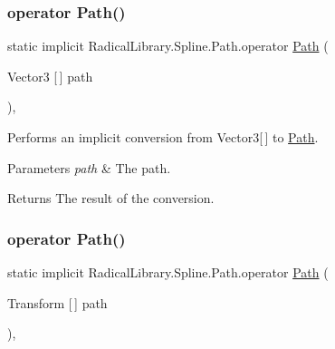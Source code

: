 \subsubsection{\texorpdfstring{operator Path()}{operator Path()}\hspace{0.1cm}{\footnotesize\ttfamily [1/3]}}
{\footnotesize\ttfamily static implicit Radical\+Library.\+Spline.\+Path.\+operator \hyperlink{class_radical_library_1_1_spline_1_1_path}{Path} (\begin{DoxyParamCaption}\item[{Vector3 \mbox{[}$\,$\mbox{]}}]{path }\end{DoxyParamCaption})\hspace{0.3cm}{\ttfamily [inline]}, {\ttfamily [static]}}



Performs an implicit conversion from Vector3\mbox{[}$\,$\mbox{]} to \hyperlink{class_radical_library_1_1_spline_1_1_path}{Path}. 


\begin{DoxyParams}{Parameters}
{\em path} & The path.\\
\hline
\end{DoxyParams}
\begin{DoxyReturn}{Returns}
The result of the conversion.
\end{DoxyReturn}
\mbox{\label{class_radical_library_1_1_spline_1_1_path_afd16f8d283f669e98a918e49b6a57b06}} 
\subsubsection{\texorpdfstring{operator Path()}{operator Path()}\hspace{0.1cm}{\footnotesize\ttfamily [2/3]}}
{\footnotesize\ttfamily static implicit Radical\+Library.\+Spline.\+Path.\+operator \hyperlink{class_radical_library_1_1_spline_1_1_path}{Path} (\begin{DoxyParamCaption}\item[{Transform \mbox{[}$\,$\mbox{]}}]{path }\end{DoxyParamCaption})\hspace{0.3cm}{\ttfamily [inline]}, {\ttfamily [static]}}



